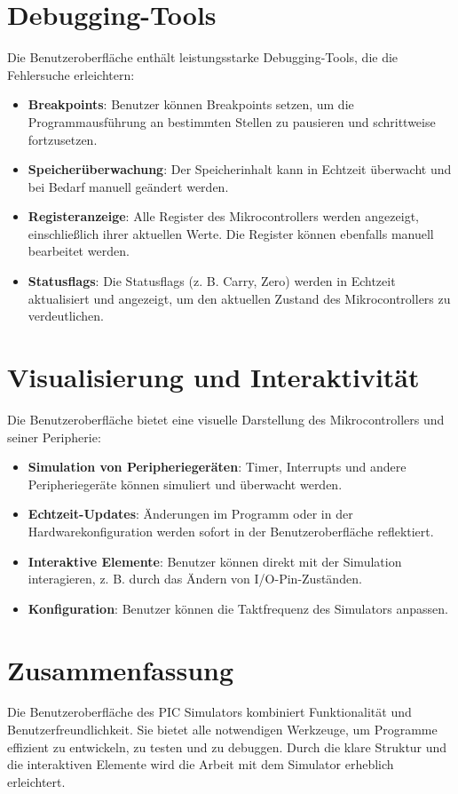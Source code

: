 \section{Debugging-Tools}
Die Benutzeroberfläche enthält leistungsstarke Debugging-Tools, die die Fehlersuche erleichtern:
\begin{itemize}
    \item \textbf{Breakpoints}: Benutzer können Breakpoints setzen, um die Programmausführung an bestimmten Stellen zu pausieren und schrittweise fortzusetzen.
    \item \textbf{Speicherüberwachung}: Der Speicherinhalt kann in Echtzeit überwacht und bei Bedarf manuell geändert werden.
    \item \textbf{Registeranzeige}: Alle Register des Mikrocontrollers werden angezeigt, einschließlich ihrer aktuellen Werte. Die Register können ebenfalls manuell bearbeitet werden.
    \item \textbf{Statusflags}: Die Statusflags (z. B. Carry, Zero) werden in Echtzeit aktualisiert und angezeigt, um den aktuellen Zustand des Mikrocontrollers zu verdeutlichen.
\end{itemize}

\section{Visualisierung und Interaktivität}
Die Benutzeroberfläche bietet eine visuelle Darstellung des Mikrocontrollers und seiner Peripherie:
\begin{itemize}
    \item \textbf{Simulation von Peripheriegeräten}: Timer, Interrupts und andere Peripheriegeräte können simuliert und überwacht werden.
    \item \textbf{Echtzeit-Updates}: Änderungen im Programm oder in der Hardwarekonfiguration werden sofort in der Benutzeroberfläche reflektiert.
    \item \textbf{Interaktive Elemente}: Benutzer können direkt mit der Simulation interagieren, z. B. durch das Ändern von I/O-Pin-Zuständen.
    \item \textbf{Konfiguration}: Benutzer können die Taktfrequenz des Simulators anpassen.
\end{itemize}

\section{Zusammenfassung}
Die Benutzeroberfläche des PIC Simulators kombiniert Funktionalität und Benutzerfreundlichkeit. Sie bietet alle notwendigen Werkzeuge, um Programme effizient zu entwickeln, zu testen und zu debuggen. Durch die klare Struktur und die interaktiven Elemente wird die Arbeit mit dem Simulator erheblich erleichtert.

